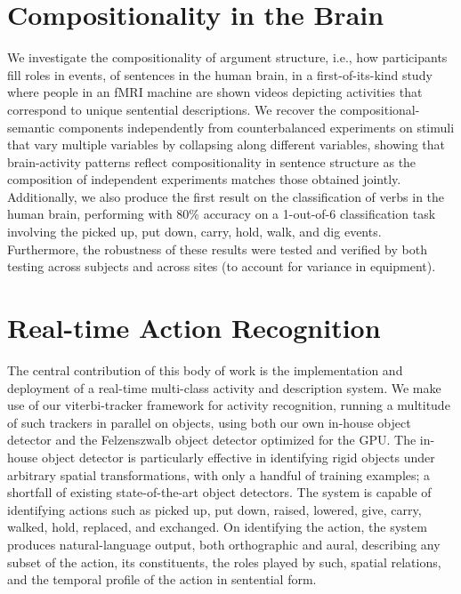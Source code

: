 \section{Compositionality in the Brain}

We investigate the compositionality of argument structure, i.e., how
participants fill roles in events, of sentences in the human brain, in a
first-of-its-kind study where people in an fMRI machine are shown videos
depicting activities that correspond to unique sentential descriptions.
%
We recover the compositional-semantic components independently from
counterbalanced experiments on stimuli that vary multiple variables by
collapsing along different variables, showing that brain-activity patterns
reflect compositionality in sentence structure as the composition of
independent experiments matches those obtained jointly.
%
Additionally, we also produce the first result on the classification of verbs
in the human brain, performing with 80\% accuracy on a 1-out-of-6
classification task involving the picked up, put down, carry, hold, walk, and
dig events.
%
Furthermore, the robustness of these results were tested and verified by both
testing across subjects and across sites (to account for variance in
equipment).

\section{Real-time Action Recognition}
The central contribution of this body of work is the implementation and
deployment of a real-time multi-class activity and description system.
%
We make use of our viterbi-tracker framework for activity recognition, running
a multitude of such trackers in parallel on objects, using both our own
in-house object detector and the Felzenszwalb object detector optimized for the
GPU.
%
The in-house object detector is particularly effective in identifying rigid
objects under arbitrary spatial transformations, with only a handful of
training examples; a shortfall of existing state-of-the-art object detectors.
%
The system is capable of identifying actions such as picked up, put down,
raised, lowered, give, carry, walked, hold, replaced, and exchanged.
%
On identifying the action, the system produces natural-language output, both
orthographic and aural, describing any subset of the action, its constituents,
the roles played by such, spatial relations, and the temporal profile of the
action in sentential form.
